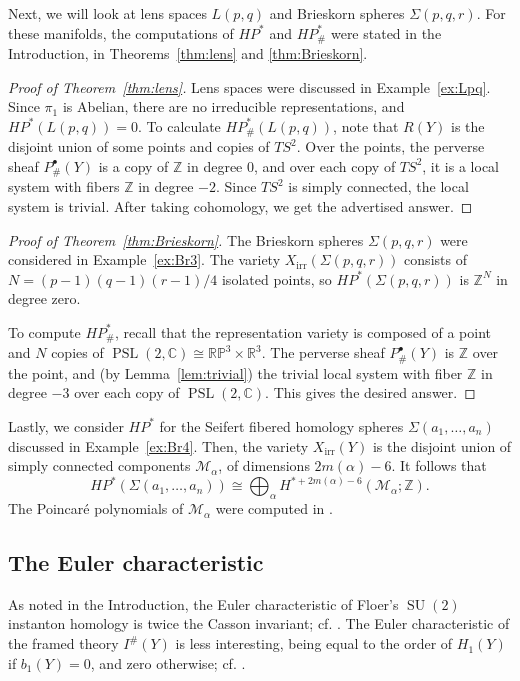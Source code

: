 \documentclass [11pt]{amsart}
\theoremstyle{remark}
\def\zz {{\mathbb{Z}}}
\def\rr {{\mathbb{R}}}
\def\cc {{\mathbb{C}}}
\def\R{\rr}
\def\Z {\zz}
\def\rp {\mathbb{RP}}
\def\HP{\mathit{HP}}
\def\psl {{\operatorname{PSL}(2, \cc)}}
\def\su {{\operatorname{SU}(2)}}
\def\Char {X}
\def\CharIrr {\Char_{\operatorname{irr}}}
\def\HPf{\HP_{\! \#}}
\def\M{\mathcal{M}}
\begin{document}
Next, we will look at lens spaces $L(p,q)$ and Brieskorn spheres $\Sigma(p,q,r)$. For these manifolds, the computations of $\HP^*$ and $\HPf^*$ were stated in the Introduction, in Theorems~\ref{thm:lens} and \ref{thm:Brieskorn}.

\begin{proof}[Proof of Theorem~\ref{thm:lens}]
Lens spaces were discussed in Example~\ref{ex:Lpq}. Since $\pi_1$ is Abelian, there are no irreducible representations, and $\HP^*(L(p,q))=0$. To calculate $\HPf^*(L(p,q))$, note that $R(Y)$ is the disjoint union of some points and copies of $TS^2$. Over the points, the perverse sheaf $P^{\bullet}_\#(Y)$ is a copy of $\Z$ in degree $0$, and over each copy of $TS^2$, it is a local system with fibers $\Z$ in degree $-2$. Since $TS^2$ is simply connected, the local system is trivial. After taking cohomology, we get the advertised answer.
\end{proof}

\begin{proof}[Proof of Theorem~\ref{thm:Brieskorn}]
The Brieskorn spheres $\Sigma(p,q,r)$ were considered in Example~\ref{ex:Br3}. The variety $\CharIrr(\Sigma(p,q,r))$ consists of $N=(p-1)(q-1)(r-1)/4$ isolated points, so $\HP^*(\Sigma(p,q,r))$ is $\Z^N$ in degree zero.

To compute $\HPf^*$, recall that the representation variety is composed of a point and $N$ copies of $\psl \cong \rp^3 \times \R^3$. The perverse sheaf $P^{\bullet}_\#(Y)$ is $\Z$ over the point, and (by Lemma~\ref{lem:trivial}) the trivial local system with fiber $\Z$ in degree $-3$ over each copy of $\psl$. This gives the desired answer.
\end{proof}


Lastly, we consider $\HP^*$ for the Seifert fibered homology spheres $\Sigma(a_1, \dots, a_n)$ discussed in Example~\ref{ex:Br4}. Then, the variety $\CharIrr(Y)$ is the disjoint union of simply connected components $\M_{\alpha}$, of dimensions $2m(\alpha)-6$. It follows that 
\begin{equation}
\label{eq:SF}
\HP^*( \Sigma(a_1, \dots, a_n)) \cong \bigoplus_{\alpha} H^{*+2m(\alpha)-6}(\M_{\alpha}; \Z).
\end{equation}
The Poincar\'e polynomials of $\M_{\alpha}$ were computed in \cite{BodenYokogawa}.

\subsection{The Euler characteristic}
As noted in the Introduction, the Euler characteristic of Floer's $\su$ instanton homology is twice the Casson invariant; cf. \cite{TaubesCasson}. The Euler characteristic of the framed theory $I^\#(Y)$ is less interesting, being equal to the order of $H_1(Y)$ if $b_1(Y)=0$, and zero otherwise; cf. \cite{Scaduto}. 
\end{document}

